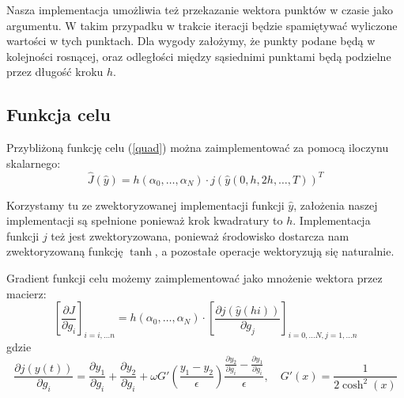 \documentclass[11pt]{article}
\begin{document}
Nasza implementacja umożliwia też przekazanie wektora punktów w czasie jako argumentu. W takim przypadku w trakcie iteracji będzie spamiętywać wyliczone wartości w tych punktach. Dla wygody założymy, że punkty podane będą w kolejności rosnącej, oraz odległości między sąsiednimi punktami będą podzielne przez długość kroku $h$.

\subsection{Funkcja celu}
Przybliżoną funkcję celu (\ref{quad}) można zaimplementować za pomocą iloczynu skalarnego:
\begin{equation}
  \hat{J}(\hat{y}) = h(\alpha_0,\ldots,\alpha_N) \cdot {j(\hat{y}(0, h, 2h, \ldots, T))}^T
\end{equation}

Korzystamy tu ze zwektoryzowanej implementacji funkcji $\hat{y}$, założenia naszej implementacji są spełnione ponieważ krok kwadratury to $h$. Implementacja funkcji $j$ też jest zwektoryzowana, ponieważ środowisko dostarcza nam zwektoryzowaną funkcję $\tanh$, a pozostałe operacje wektoryzują się naturalnie.

Gradient funkcji celu możemy zaimplementować jako mnożenie wektora przez macierz:
\begin{equation}
  {\left[\frac{\partial J}{\partial g_i}\right]}_{i = i, \ldots n} = h(\alpha_0,\ldots,\alpha_N) \cdot {\left[\frac{\partial j(\hat{y}(hi))}{\partial g_j}\right]}_{i = 0, \ldots N, j = 1, \ldots n}
\end{equation}
gdzie
\begin{equation}
  \frac{\partial j(y(t))}{\partial g_i} = \frac{\partial y_1}{\partial g_i} + \frac{\partial y_2}{\partial g_i} + \omega G'\left(\frac{y_1 - y_2}{\epsilon}\right)\frac{\frac{\partial y_2}{\partial g_i} - \frac{\partial y_1}{\partial g_i}}{\epsilon},\quad G'(x) = \frac{1}{2\cosh^2(x)}
\end{equation}
\end{document}

